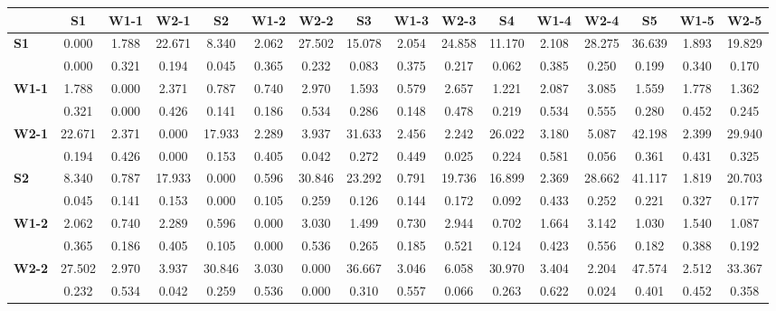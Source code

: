 \begin{table*}[h!]
\begin{center}
\begin{tabular}{| l || c | c | c || c | c | c || c | c | c || c | c | c || c | c | c |}\hline
 & {\bf S1} & {\bf W1-1} & {\bf W2-1} & {\bf S2} & {\bf W1-2} & {\bf W2-2} & {\bf S3} & {\bf W1-3} & {\bf W2-3} & {\bf S4} & {\bf W1-4} & {\bf W2-4} & {\bf S5} & {\bf W1-5} & {\bf W2-5} \\\hline\hline
{\bf S1} & 0.000 & 1.788 & 22.671 & 8.340 & 2.062 & 27.502 & 15.078 & 2.054 & 24.858 & 11.170 & 2.108 & 28.275 & 36.639 & 1.893 & 19.829 \\
 & 0.000  & 0.321  & 0.194  & 0.045  & 0.365  & 0.232  & 0.083  & 0.375  & 0.217  & 0.062  & 0.385  & 0.250  & 0.199  & 0.340  & 0.170 \\\hline
{\bf W1-1} & 1.788 & 0.000 & 2.371 & 0.787 & 0.740 & 2.970 & 1.593 & 0.579 & 2.657 & 1.221 & 2.087 & 3.085 & 1.559 & 1.778 & 1.362 \\
 & 0.321  & 0.000  & 0.426  & 0.141  & 0.186  & 0.534  & 0.286  & 0.148  & 0.478  & 0.219  & 0.534  & 0.555  & 0.280  & 0.452  & 0.245 \\\hline
{\bf W2-1} & 22.671 & 2.371 & 0.000 & 17.933 & 2.289 & 3.937 & 31.633 & 2.456 & 2.242 & 26.022 & 3.180 & 5.087 & 42.198 & 2.399 & 29.940 \\
 & 0.194  & 0.426  & 0.000  & 0.153  & 0.405  & 0.042  & 0.272  & 0.449  & 0.025  & 0.224  & 0.581  & 0.056  & 0.361  & 0.431  & 0.325 \\\hline\hline
{\bf S2} & 8.340 & 0.787 & 17.933 & 0.000 & 0.596 & 30.846 & 23.292 & 0.791 & 19.736 & 16.899 & 2.369 & 28.662 & 41.117 & 1.819 & 20.703 \\
 & 0.045  & 0.141  & 0.153  & 0.000  & 0.105  & 0.259  & 0.126  & 0.144  & 0.172  & 0.092  & 0.433  & 0.252  & 0.221  & 0.327  & 0.177 \\\hline
{\bf W1-2} & 2.062 & 0.740 & 2.289 & 0.596 & 0.000 & 3.030 & 1.499 & 0.730 & 2.944 & 0.702 & 1.664 & 3.142 & 1.030 & 1.540 & 1.087 \\
 & 0.365  & 0.186  & 0.405  & 0.105  & 0.000  & 0.536  & 0.265  & 0.185  & 0.521  & 0.124  & 0.423  & 0.556  & 0.182  & 0.388  & 0.192 \\\hline
{\bf W2-2} & 27.502 & 2.970 & 3.937 & 30.846 & 3.030 & 0.000 & 36.667 & 3.046 & 6.058 & 30.970 & 3.404 & 2.204 & 47.574 & 2.512 & 33.367 \\
 & 0.232  & 0.534  & 0.042  & 0.259  & 0.536  & 0.000  & 0.310  & 0.557  & 0.066  & 0.263  & 0.622  & 0.024  & 0.401  & 0.452  & 0.358 \\\hline\hline

\end{tabular}
\end{center}
\end{table*}

